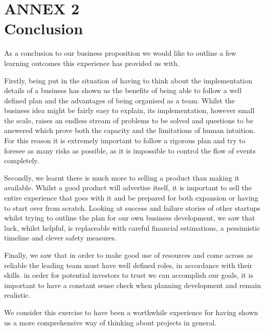 \documentclass[11pt]{article}
\begin{document}
\newpage


\section{ANNEX 2 \\ Conclusion}
As a conclusion to our business proposition we would like to outline a few
learning outcomes this experience has provided us with.

Firstly, being put in the situation of having to think about the implementation
details of a business has shown us the benefits of being able to follow a well
defined plan and the advantages of being organised as a team. Whilst the
business idea might be fairly easy to explain, its implementation, however small
the scale, raises an endless stream of problems to be solved and questions to
be answered which prove both the capacity and the limitations of human
intuition. For this reason it is extremely important to follow a rigorous plan
and try to foresee as many risks as possible, as it is impossible to control the
flow of events completely.

Secondly, we learnt there is much more to selling a product than making it
available. Whilst a good product will advertise itself, it is important to sell
the entire experience that goes with it and be prepared for both expansion or
having to start over from scratch. Looking at success and failure stories of
other startups whilst trying to outline the plan for our own business
development, we saw that luck, whilst helpful, is replaceable with careful
financial estimations, a pessimistic timeline and clever safety measures.

Finally, we saw that in order to make good use of resources and come across as
reliable the leading team must have well defined roles, in accordance with their
skills. in order for potential investors to trust we can accomplish our goals,
it is important to have a constant sense check when planning development and
remain realistic.

We consider this exercise to have been a worthwhile experience for having shown
us a more comprehensive way of thinking about projects in general.

\newpage

\end{document}
